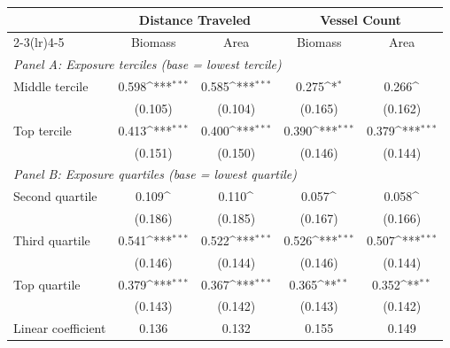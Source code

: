 \def\sym#1{\ifmmode^{#1}\else\(^{#1}\)\fi}
\begin{tabular}{l*{4}{c}}
\hline\hline
 &\multicolumn{2}{c}{Distance Traveled}&\multicolumn{2}{c}{Vessel Count}\\
\cmidrule(lr){2-3}\cmidrule(lr){4-5}
 &\multicolumn{1}{c}{Biomass}&\multicolumn{1}{c}{Area}&\multicolumn{1}{c}{Biomass}&\multicolumn{1}{c}{Area}\\
\hline
\multicolumn{5}{l}{\emph{Panel A: Exposure terciles (base = lowest tercile)}}\\
Middle tercile        &0.598\sym{***}&0.585\sym{***}&0.275\sym{*}&0.266\sym{}\\
                      &(0.105)&(0.104)&(0.165)&(0.162)\\
Top tercile           &0.413\sym{***}&0.400\sym{***}&0.390\sym{***}&0.379\sym{***}\\
                      &(0.151)&(0.150)&(0.146)&(0.144)\\
[0.4em]
\multicolumn{5}{l}{\emph{Panel B: Exposure quartiles (base = lowest quartile)}}\\
Second quartile       &0.109\sym{}&0.110\sym{}&0.057\sym{}&0.058\sym{}\\
                      &(0.186)&(0.185)&(0.167)&(0.166)\\
Third quartile        &0.541\sym{***}&0.522\sym{***}&0.526\sym{***}&0.507\sym{***}\\
                      &(0.146)&(0.144)&(0.146)&(0.144)\\
Top quartile          &0.379\sym{***}&0.367\sym{***}&0.365\sym{**}&0.352\sym{**}\\
                      &(0.143)&(0.142)&(0.143)&(0.142)\\
\hline
Linear coefficient&0.136&0.132&0.155&0.149\\
\hline\hline
\end{tabular}